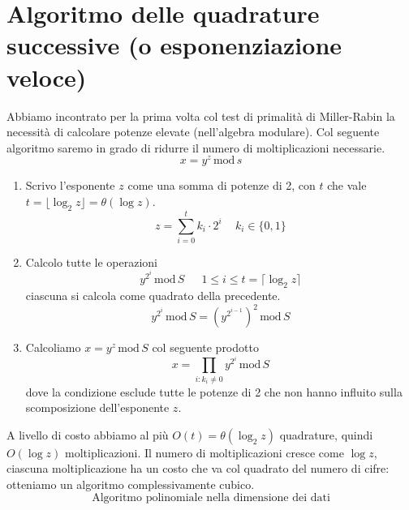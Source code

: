 \section{Algoritmo delle quadrature successive (o esponenziazione veloce)}
Abbiamo incontrato per la prima volta col test di primalità di Miller-Rabin la necessità di calcolare potenze elevate (nell'algebra modulare). Col seguente algoritmo saremo in grado di ridurre il numero di moltiplicazioni necessarie. 
\[x=y^z\,\text{mod}\,s\]
\begin{enumerate}
	\item Scrivo l'esponente $z$ come una somma di potenze di 2, con $t$ che vale\\$t=\lfloor \log_2 z \rfloor=\theta(\log z)$.
	\[z=\sum_{i=0}^t k_i \cdot 2^i\,\,\,\,\,\,\,k_i \in \{0,1\}\]
	
	\item Calcolo tutte le operazioni 
	\[y^{2^i}\,\text{mod}\,S\,\,\,\,\,\,\,\,\,1\leq i \leq t=\lceil \log_2 z\rceil\]
	ciascuna si calcola come quadrato della precedente.
	\[y^{2^i}\,\text{mod}\,S=\left(y^{2^{i-1}}\right)^2\,\text{mod}\,S\]
	\item Calcoliamo $x=y^z\,\text{mod}\,S$ col seguente prodotto
	\[x=\prod_{i:k_i \neq 0}y^{2^i}\,\text{mod}\,S\]
	dove la condizione esclude tutte le potenze di 2 che non hanno influito sulla scomposizione dell'esponente $z$. 
\end{enumerate}  
A livello di costo abbiamo al più $O(t)=\theta(\log_2 z)$ quadrature, quindi $O(\log z)$ moltiplicazioni. Il numero di moltiplicazioni cresce come $\log z$, ciascuna moltiplicazione ha un costo che va col quadrato del numero di cifre: otteniamo un algoritmo complessivamente cubico.
\[\boxed{\text{Algoritmo polinomiale nella dimensione dei dati}}\]

